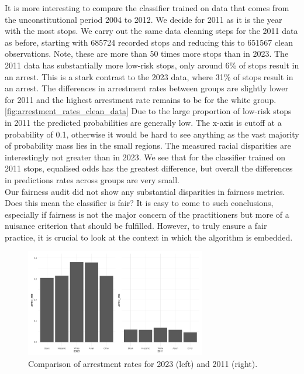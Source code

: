 It is more interesting to compare the classifier trained on data that comes from the unconstitutional period 2004 to 2012. We decide for 2011 as it is the year with the most stops.
We carry out the same data cleaning steps for the 2011 data as before, starting with 685724 recorded stops and reducing this to 651567 clean observations. Note, these are more than 50 times more stops than in 2023.
The 2011 data has substantially more low-risk stops, only around 6\% of stops result in an arrest. This is a stark contrast to the 2023 data, where 31\% of stops result in an arrest.
The differences in arrestment rates between groups are slightly lower for 2011 and the highest arrestment rate remains to be for the white group. \autoref{fig:arrestment_rates_clean_data}
Due to the large proportion of low-risk stops in 2011 the predicted probabilities are generally low. The x-axis is cutoff at a probability of 0.1, otherwise it would be hard to see anything as the vast majority of probability mass lies in the small regions.
The measured racial disparities are interestingly not greater than in 2023. We see that for the classifier trained on 2011 stops, equalised odds has the greatest difference, but overall the differences in predictions rates across groups are very small. \\ 
Our fairness audit did not show any substantial disparities in fairness metrics. Does this mean the classifier is fair?
It is easy to come to such conclusions, especially if fairness is not the major concern of the practitioners but more of a nuisance criterion that should be fulfilled. However, to truly ensure a fair practice, it is crucial to look at the context in which the algorithm is embedded.

\begin{figure}
    \centering
    \includegraphics[width=0.7\textwidth]{../figures/sqf_case_study_plot10.png}
    \caption{Comparison of arrestment rates for 2023 (left) and 2011 (right).}
    \label{fig:arrestment_rates_clean_data}
\end{figure}

